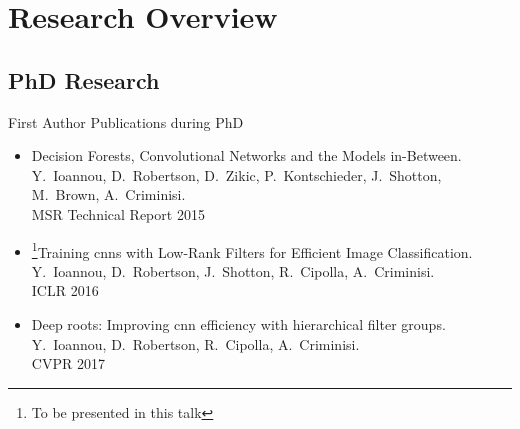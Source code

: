 \documentclass[t,xcolor=dvipsnames]{beamer}
\begin{document}
\usebackgroundtemplate{}

\section{Research Overview}

\subsection{PhD Research}

\begin{frame}{First Author Publications during PhD}
\renewcommand{\thefootnote}{\fnsymbol{footnote}}
\begin{itemize}
    \item Decision Forests, Convolutional Networks and the Models in-Between.\\{\footnotesize Y.\ Ioannou, D.\ Robertson, D.\ Zikic, P.\ Kontschieder, J.\ Shotton, M.\ Brown, A.\ Criminisi.\\MSR Technical Report 2015} 
    \item \footnote{To be presented in this talk}Training \glspl{cnn} with Low-Rank Filters for Efficient Image Classification.\\{\footnotesize Y.\ Ioannou, D.\ Robertson, J.\ Shotton, R.\ Cipolla, A.\ Criminisi. \\ICLR 2016}
    \item \footnotemark[1]Deep roots: Improving \gls{cnn} efficiency with hierarchical filter groups.\\{\footnotesize Y.\ Ioannou, D.\ Robertson, R.\ Cipolla, A.\ Criminisi.\\CVPR 2017}
\end{itemize}
\end{frame}
\end{document}
